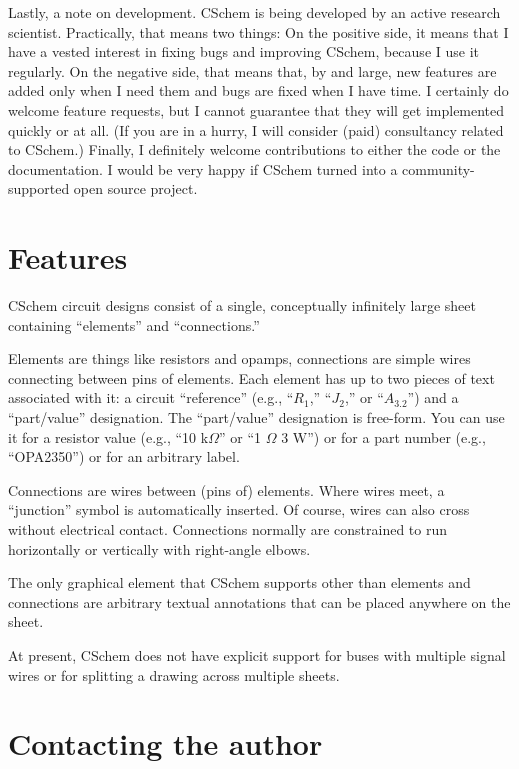 \documentclass[11pt]{report}
\def\Ohm{$\Omega$}
\begin{document}
%
Lastly, a note on development. CSchem is being developed by an
active research scientist. Practically, that means two things: On the
positive side, it means that I have a vested interest in fixing bugs
and improving CSchem, because I use it regularly. On the negative side, that
means that, by and large, new features are added only when I need them
and bugs are fixed when I have time. I certainly do welcome feature
requests, but I cannot guarantee that they will get implemented
quickly or at all. (If you are in a hurry, I will consider (paid)
consultancy related to CSchem.) Finally, I definitely welcome
contributions to either the code or the documentation. I would be very
happy if CSchem turned into a community-supported open source project.

\section{Features}

CSchem circuit designs consist of a single, conceptually infinitely
large sheet containing ``elements'' and ``connections.''

Elements are things like resistors and opamps, connections are simple
wires connecting between pins of elements. Each element has up to two
pieces of text associated with it: a circuit ``reference'' (e.g.,
``$R_1$,'' ``$J_2$,'' or ``$A_{3.2}$'') and a ``part/value''
designation. The ``part/value'' designation is free-form. You can use
it for a resistor value (e.g., ``10 k\Ohm'' or ``1 \Ohm{} 3 W'') or
for a part number (e.g., ``OPA2350'') or for an arbitrary
label.

Connections are wires between (pins of) elements. Where wires meet, a
``junction'' symbol is automatically inserted. Of course, wires can
also cross without electrical contact. Connections normally are
constrained to run horizontally or vertically with right-angle elbows.

The only graphical element that CSchem supports other than elements
and connections are arbitrary textual annotations that can be placed anywhere on
the sheet.

At present, CSchem does not have explicit support for buses with
multiple signal wires or for splitting a drawing across multiple sheets.

\section{Contacting the author}
\end{document}
